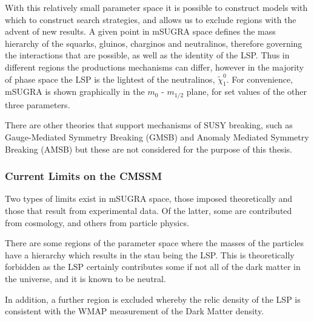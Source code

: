 With this relatively small parameter space it is possible to construct models with which to construct search strategies, and allows us to exclude regions with the advent of new results. A given point in mSUGRA space defines the mass hierarchy of the squarks, gluinos, charginos and neutralinos, therefore governing the interactions that are possible, as well as the identity of the LSP. Thus in different regions the productions mechanisms can differ, however in the majority of phase space the LSP is the lightest of the neutralinos, $\tilde{\chi}^{0}_{1}$.  For convenience, mSUGRA is shown graphically in the $m_{0}$ - $m_{1/2}$ plane, for set values of the other three parameters. 

There are other theories that support mechanisms of SUSY breaking, such as Gauge-Mediated Symmetry Breaking (GMSB) and Anomaly Mediated Symmetry Breaking (AMSB) but these are not considered for the purpose of this thesis. 

\subsubsection{Current Limits on the CMSSM}

Two types of limits exist in mSUGRA space, those imposed theoretically and those that result from experimental data. Of the latter, some are contributed from cosmology, and others from particle physics. 

There are some regions of the parameter space where the masses of the particles have a hierarchy which results in the stau being the LSP. This is theoretically forbidden as the LSP certainly contributes some if not all of the dark matter in the universe, and it is known to be neutral. 

In addition, a further region is excluded whereby the relic density of the LSP is consistent with the WMAP measurement of the Dark Matter density. 

